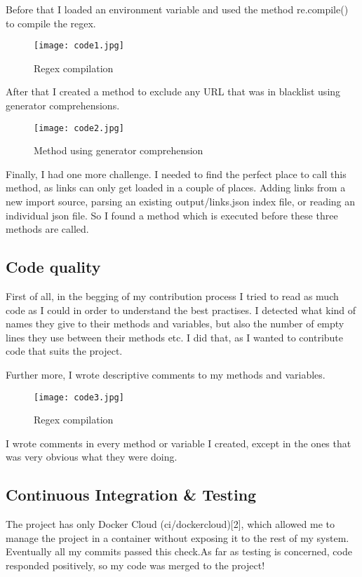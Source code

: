 \documentclass{article}
\begin{document}
Before that I loaded an environment variable and used the method re.compile() to compile the regex.
\begin{figure}[tph!]
\centerline{\texttt{[image: code1.jpg]}}
    \caption{Regex compilation}
    \label{fig:verticalcell}
\end{figure}

After that I created a method to exclude any URL that was in blacklist using generator comprehensions. 

\begin{figure}[tph!]
\centerline{\texttt{[image: code2.jpg]}}
    \caption{Method using generator comprehension}
    \label{fig:verticalcell}
\end{figure}

Finally, I had one more challenge. I needed to find the perfect place to call this method, as links can only get loaded in a couple of places. Adding links from a new import source, parsing an existing output/links.json index file, or reading an individual json file. So I found a method which is executed before these three methods are called. 

\subsection{Code quality}

First of all, in the begging of my contribution process I tried to read as much code as I could in order to understand the best practises. I detected what kind of names they give to their methods and variables, but also the number of empty lines they use between their methods etc. I did that, as I wanted to contribute code that suits the project.

Further more, I wrote descriptive comments to my methods and variables. 
\begin{figure}[tph!]
\centerline{\texttt{[image: code3.jpg]}}
    \caption{Regex compilation}
    \label{fig:verticalcell}
\end{figure}

I wrote comments in every method or variable I created, except in the ones that was very obvious what they were doing.

\subsection{Continuous Integration \& Testing}
The project has only Docker Cloud (ci/dockercloud)[2], which allowed me to manage the project in a container without exposing it to the rest of my system. Eventually all my commits passed this check.As far as testing is concerned, code responded positively, so my code was merged to the project!
\end{document}

